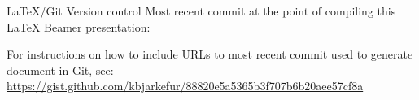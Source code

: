 \begin{frame}{LaTeX/Git Version control}
	Most recent commit at the point of compiling this \LaTeX{} Beamer presentation:

	\commiturl
	
	\vspace{1cm}
	
	\small For instructions on how to include URLs to most recent commit used to generate document in Git, see: \url{https://gist.github.com/kbjarkefur/88820e5a5365b3f707b6b20aee57cf8a}

\end{frame}
